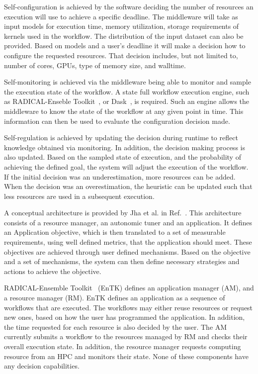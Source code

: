 {Self-configuration is achieved by the software deciding the number of resources 
an execution will use to achieve a specific deadline. The middleware will take as 
input models for execution time, memory utilization, storage requirements of kernels used in the workflow. The distribution of the input dataset can also be provided. Based on models 
and a user's deadline it will make a decision how to configure the requested 
resources. That decision includes, but not limited to, number of cores, GPUs, 
type of memory size, and walltime.

Self-monitoring is achieved via the middleware being able to monitor and sample 
the execution state of the workflow. A state full workflow execution engine, such as 
RADICAL-Enseble Toolkit~\cite{balasubramanian2018harnessing}, or Dask~\cite{rocklin2015dask}, 
is required. Such an engine allows the middleware to know the state of the workflow 
at any given point in time. This information can then be used to evaluate the 
configuration decision made.

Self-regulation is achieved by updating the decision during runtime to reflect 
knowledge obtained via monitoring. In addition, the decision making process 
is also updated. Based on the sampled state of execution, and the probability 
of achieving the defined goal, the system will adjust the execution of the 
workflow. If the initial decision was an underestimation, 
more resources can be added. When the decision was an overestimation, the heuristic 
can be updated such that less resources are used in a subsequent execution.

A conceptual architecture is provided by Jha et al. in Ref.~\cite{jha2009self}. 
This architecture consists of a resource manager, an autonomic tuner and an application. 
It defines an Application objective, which is then translated to a set of measurable 
requirements, using well defined metrics, that the application should meet. These 
objectives are achieved through user defined mechanisms. Based on the objective and 
a set of mechanisms, the system can then define necessary strategies and actions to 
achieve the objective.

RADICAL-Ensemble Toolkit~\cite{balasubramanian2018harnessing} (EnTK) defines 
an application manager (AM), and a resource manager (RM). EnTK defines an 
application as a sequence of workflows that are executed. The workflows may 
either reuse resources or request new ones, based on how the user has programmed 
the application. In addition, the time requested for each resource is also 
decided by the user. The AM currently submits a workflow to the resources 
managed by RM and checks their overall execution state. In addition, the resource 
manager requests computing resource from an HPC and monitors their state. None 
of these components have any decision capabilities.

}
